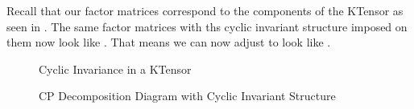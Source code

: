 
Recall that our factor matrices correspond to the components of the KTensor as
seen in . The same factor matrices with ths
cyclic invariant structure imposed on them now look like
. That means we can now adjust  to
look like .

\begin{figure}
    \centering
    
    \caption{Cyclic Invariance in a KTensor}
    \label{fig:cyc_inv_matrices}
\end{figure}

\begin{figure}
    \centering
    
    \caption{CP Decomposition Diagram with Cyclic Invariant Structure}
    \label{fig:cyc_inv_cp}
\end{figure}


